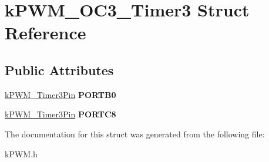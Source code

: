 \hypertarget{structkPWM__OC3__Timer3}{}\section{k\+P\+W\+M\+\_\+\+O\+C3\+\_\+\+Timer3 Struct Reference}
\label{structkPWM__OC3__Timer3}
\subsection*{Public Attributes}
\begin{DoxyCompactItemize}
\item 
\hyperlink{structkPWM__Timer3Pin}{k\+P\+W\+M\+\_\+\+Timer3\+Pin} {\bfseries P\+O\+R\+T\+B0}\hypertarget{structkPWM__OC3__Timer3_a62c845e69156ef673b10f91dc332a8e6}{}\label{structkPWM__OC3__Timer3_a62c845e69156ef673b10f91dc332a8e6}

\item 
\hyperlink{structkPWM__Timer3Pin}{k\+P\+W\+M\+\_\+\+Timer3\+Pin} {\bfseries P\+O\+R\+T\+C8}\hypertarget{structkPWM__OC3__Timer3_a35a6ba1c3f34a730fe477e380148a256}{}\label{structkPWM__OC3__Timer3_a35a6ba1c3f34a730fe477e380148a256}

\end{DoxyCompactItemize}


The documentation for this struct was generated from the following file\+:\begin{DoxyCompactItemize}
\item 
k\+P\+W\+M.\+h\end{DoxyCompactItemize}
